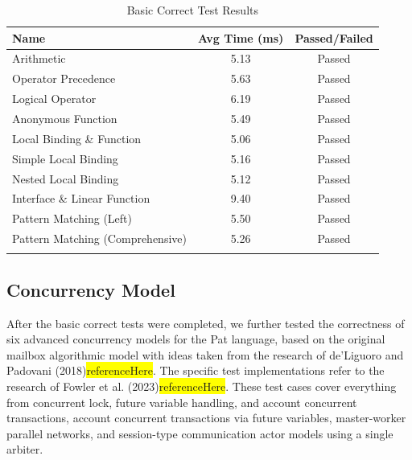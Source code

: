 \documentclass{l4proj}
\begin{document}
\begin{table}[h]
\centering
\begin{tabular}{@{}lcc@{}} %
\toprule %
\textbf{Name} & \textbf{Avg Time (ms)} & \textbf{Passed/Failed} \\
\midrule %
Arithmetic & 5.13& Passed \\
Operator Precedence & 5.63& Passed \\
Logical Operator & 6.19 & Passed \\
Anonymous Function & 5.49 & Passed \\
Local Binding \& Function & 5.06 & Passed \\
Simple Local Binding & 5.16 & Passed \\
Nested Local Binding & 5.12 & Passed \\
Interface \& Linear Function & 9.40 & Passed \\
Pattern Matching (Left) & 5.50 & Passed \\
Pattern Matching (Comprehensive) & 5.26 & Passed \\
\bottomrule \\%
\end{tabular}
\caption{Basic Correct Test Results}
\label{tab:Fundamental_results}
\end{table}

\subsection{Concurrency Model}
After the basic correct tests were completed, we further tested the correctness of six advanced concurrency models for the Pat language, based on the original mailbox algorithmic model with ideas taken from the research of de'Liguoro and Padovani (2018)\colorbox{yellow}{referenceHere}. The specific test implementations refer to the research of Fowler et al. (2023)\colorbox{yellow}{referenceHere}. These test cases cover everything from concurrent lock, future variable handling, and account concurrent transactions, account concurrent transactions via future variables, master-worker parallel networks, and session-type communication actor models using a single arbiter.
\end{document}
